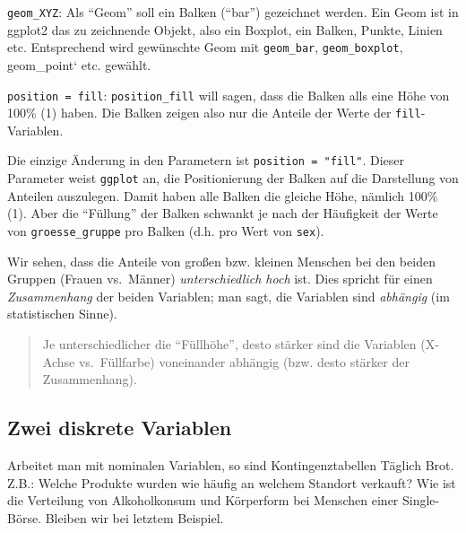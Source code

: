 \documentclass[12pt,ngerman,]{book}
\newenvironment{Shaded}{\begin{snugshade}}{\end{snugshade}}
\newcommand{\KeywordTok}[1]{\textcolor[rgb]{0.13,0.29,0.53}{\textbf{{#1}}}}
\newcommand{\DataTypeTok}[1]{\textcolor[rgb]{0.13,0.29,0.53}{{#1}}}
\newcommand{\DecValTok}[1]{\textcolor[rgb]{0.00,0.00,0.81}{{#1}}}
\newcommand{\StringTok}[1]{\textcolor[rgb]{0.31,0.60,0.02}{{#1}}}
\newcommand{\NormalTok}[1]{{#1}}
\renewenvironment{Shaded}{\begin{kframe}}{\end{kframe}}
\begin{document}
\texttt{geom\_XYZ}: Als ``Geom'' soll ein Balken (``bar'') gezeichnet
werden. Ein Geom ist in ggplot2 das zu zeichnende Objekt, also ein
Boxplot, ein Balken, Punkte, Linien etc. Entsprechend wird gewünschte
Geom mit \texttt{geom\_bar}, \texttt{geom\_boxplot}, geom\_point` etc.
gewählt.

\texttt{position\ =\ fill}: \texttt{position\_fill} will sagen, dass die
Balken alls eine Höhe von 100\% (1) haben. Die Balken zeigen also nur
die Anteile der Werte der \texttt{fill}-Variablen.

Die einzige Änderung in den Parametern ist \texttt{position\ =\ "fill"}.
Dieser Parameter weist \texttt{ggplot} an, die Positionierung der Balken
auf die Darstellung von Anteilen auszulegen. Damit haben alle Balken die
gleiche Höhe, nämlich 100\% (1). Aber die ``Füllung'' der Balken
schwankt je nach der Häufigkeit der Werte von \texttt{groesse\_gruppe}
pro Balken (d.h. pro Wert von \texttt{sex}).

Wir sehen, dass die Anteile von großen bzw. kleinen Menschen bei den
beiden Gruppen (Frauen vs.~Männer) \emph{unterschiedlich hoch} ist. Dies
spricht für einen \emph{Zusammenhang} der beiden Variablen; man sagt,
die Variablen sind \emph{abhängig} (im statistischen Sinne).

\begin{quote}
Je unterschiedlicher die ``Füllhöhe'', desto stärker sind die Variablen
(X-Achse vs.~Füllfarbe) voneinander abhängig (bzw. desto stärker der
Zusammenhang).
\end{quote}

\subsection{Zwei diskrete Variablen}\label{zwei-diskrete-variablen}

Arbeitet man mit nominalen Variablen, so sind Kontingenztabellen Täglich
Brot. Z.B.: Welche Produkte wurden wie häufig an welchem Standort
verkauft? Wie ist die Verteilung von Alkoholkonsum und Körperform bei
Menschen einer Single-Börse. Bleiben wir bei letztem Beispiel.

\begin{Shaded}
\end{Shaded}
\end{document}
